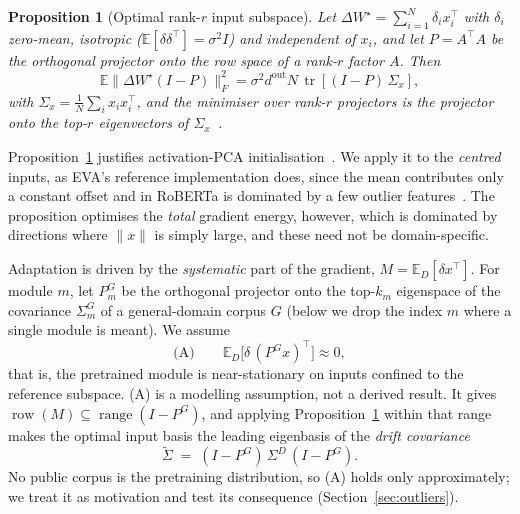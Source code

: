 \documentclass[conference]{IEEEtran}
\newtheorem{proposition}{Proposition}
\newcommand{\E}{\mathbb{E}}
\newcommand{\tr}{\operatorname{tr}}
\begin{document}
\begin{proposition}[Optimal rank-$r$ input subspace]
\label{prop:pca}
Let $\Delta W^{\star} = \sum_{i=1}^{N}\delta_i x_i^{\top}$ with $\delta_i$
zero-mean, isotropic ($\E[\delta\delta^{\top}] = \sigma^2 I$) and independent of
$x_i$, and let $P = A^{\top}A$ be the orthogonal projector onto the row space of
a rank-$r$ factor $A$. Then
\begin{equation}
\E\bigl\|\Delta W^{\star}(I-P)\bigr\|_F^2
   = \sigma^2 d^{\mathrm{out}} N \, \tr\!\left[(I-P)\,\Sigma_x\right],
\end{equation}
with $\Sigma_x = \frac{1}{N}\sum_i x_i x_i^{\top}$, and the minimiser over
rank-$r$ projectors is the projector onto the top-$r$ eigenvectors of
$\Sigma_x$~\cite{eckart1936approximation}.
\end{proposition}

Proposition~\ref{prop:pca} justifies activation-PCA
initialisation~\cite{paischer2025eva}. We apply it to the \emph{centred} inputs,
as EVA's reference implementation does, since the mean contributes only a
constant offset and in RoBERTa is dominated by a few outlier
features~\cite{kovaleva2021bertbusters,puccetti2022outliers}. The proposition
optimises the \emph{total} gradient energy, however, which is dominated by
directions where $\|x\|$ is simply large, and these need not be domain-specific.

Adaptation is driven by the \emph{systematic} part of the gradient,
$M = \E_D[\delta x^{\top}]$. For module $m$, let $P^{G}_m$ be the orthogonal
projector onto the top-$k_m$ eigenspace of the covariance $\Sigma^{G}_m$ of a
general-domain corpus $G$ (below we drop the index $m$ where a single module is
meant). We assume
\begin{equation}
\text{(A)}\qquad \E_D\bigl[\delta\,(P^{G}x)^{\top}\bigr] \approx 0 ,
\end{equation}
that is, the pretrained module is near-stationary on inputs confined to the
reference subspace. (A) is a modelling assumption, not a derived result. It
gives $\operatorname{row}(M) \subseteq \operatorname{range}(I - P^{G})$, and
applying Proposition~\ref{prop:pca} within that range makes the optimal input
basis the leading eigenbasis of the \emph{drift covariance}
\begin{equation}
\widetilde{\Sigma} \;=\; (I - P^{G})\,\Sigma^{D}\,(I - P^{G}).
\label{eq:drift}
\end{equation}
No public corpus is the pretraining distribution, so (A) holds only
approximately; we treat it as motivation and test its consequence
(Section~\ref{sec:outliers}).
\end{document}
